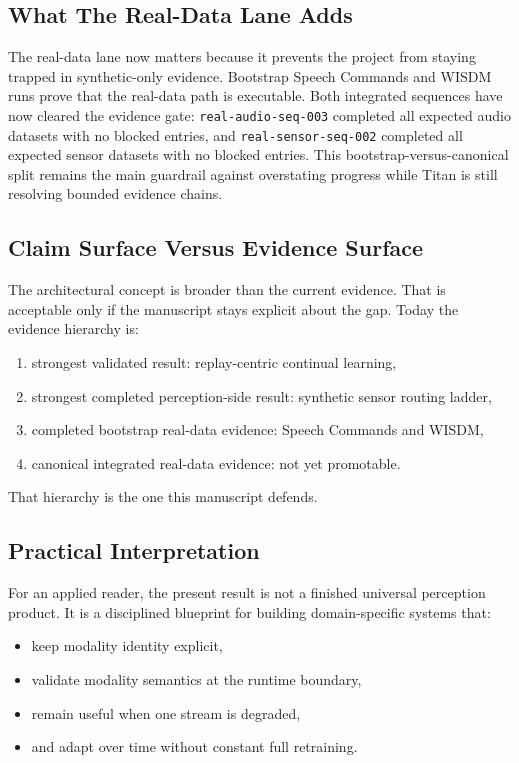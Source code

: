 \documentclass{article}
\begin{document}
\subsection{What The Real-Data Lane Adds}

The real-data lane now matters because it prevents the project from staying trapped in synthetic-only evidence. Bootstrap Speech Commands and WISDM runs prove that the real-data path is executable. Both integrated sequences have now cleared the evidence gate: \texttt{real-audio-seq-003} completed all expected audio datasets with no blocked entries, and \texttt{real-sensor-seq-002} completed all expected sensor datasets with no blocked entries. This bootstrap-versus-canonical split remains the main guardrail against overstating progress while Titan is still resolving bounded evidence chains.

\subsection{Claim Surface Versus Evidence Surface}

The architectural concept is broader than the current evidence. That is acceptable only if the manuscript stays explicit about the gap. Today the evidence hierarchy is:
\begin{enumerate}[leftmargin=*]
  \item strongest validated result: replay-centric continual learning,
  \item strongest completed perception-side result: synthetic sensor routing ladder,
  \item completed bootstrap real-data evidence: Speech Commands and WISDM,
  \item canonical integrated real-data evidence: not yet promotable.
\end{enumerate}
That hierarchy is the one this manuscript defends.

\subsection{Practical Interpretation}

For an applied reader, the present result is not a finished universal perception product. It is a disciplined blueprint for building domain-specific systems that:
\begin{itemize}[leftmargin=*]
  \item keep modality identity explicit,
  \item validate modality semantics at the runtime boundary,
  \item remain useful when one stream is degraded,
  \item and adapt over time without constant full retraining.
\end{itemize}
\end{document}
